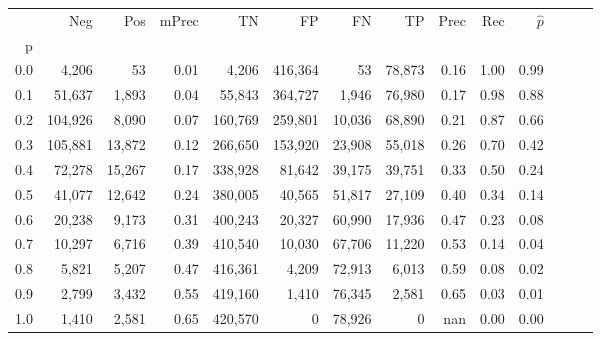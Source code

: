 \begin{tabular}{rrrrrrrrrrrrrr}
\toprule
{} &      Neg &     Pos & mPrec &       TN &       FP &      FN &      TP &  Prec &   Rec & $\hat{p}$ \\
p   &          &         &       &          &          &         &         &       &       &           \\
\midrule
0.0 &    4,206 &      53 &  0.01 &    4,206 &  416,364 &      53 &  78,873 &  0.16 &  1.00 &      0.99 \\
0.1 &   51,637 &   1,893 &  0.04 &   55,843 &  364,727 &   1,946 &  76,980 &  0.17 &  0.98 &      0.88 \\
0.2 &  104,926 &   8,090 &  0.07 &  160,769 &  259,801 &  10,036 &  68,890 &  0.21 &  0.87 &      0.66 \\
0.3 &  105,881 &  13,872 &  0.12 &  266,650 &  153,920 &  23,908 &  55,018 &  0.26 &  0.70 &      0.42 \\
0.4 &   72,278 &  15,267 &  0.17 &  338,928 &   81,642 &  39,175 &  39,751 &  0.33 &  0.50 &      0.24 \\
0.5 &   41,077 &  12,642 &  0.24 &  380,005 &   40,565 &  51,817 &  27,109 &  0.40 &  0.34 &      0.14 \\
0.6 &   20,238 &   9,173 &  0.31 &  400,243 &   20,327 &  60,990 &  17,936 &  0.47 &  0.23 &      0.08 \\
0.7 &   10,297 &   6,716 &  0.39 &  410,540 &   10,030 &  67,706 &  11,220 &  0.53 &  0.14 &      0.04 \\
0.8 &    5,821 &   5,207 &  0.47 &  416,361 &    4,209 &  72,913 &   6,013 &  0.59 &  0.08 &      0.02 \\
0.9 &    2,799 &   3,432 &  0.55 &  419,160 &    1,410 &  76,345 &   2,581 &  0.65 &  0.03 &      0.01 \\
1.0 &    1,410 &   2,581 &  0.65 &  420,570 &        0 &  78,926 &       0 &   nan &  0.00 &      0.00 \\
\bottomrule
\end{tabular}
